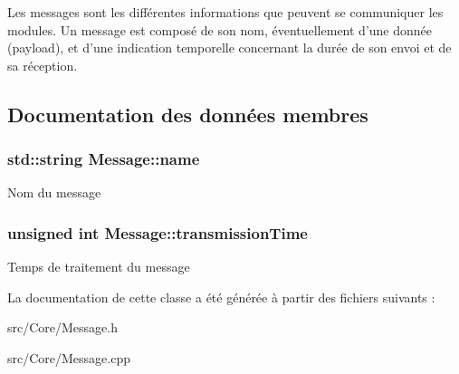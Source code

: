 Les messages sont les différentes informations que peuvent se communiquer les modules. Un message est composé de son nom, éventuellement d'une donnée (payload), et d'une indication temporelle concernant la durée de son envoi et de sa réception. 

\subsection{Documentation des données membres}
\hypertarget{classMessage_ac7adddb666acdc47c48f684bd6810a51}{
\subsubsection[{name}]{\setlength{\rightskip}{0pt plus 5cm}std\-::string Message\-::name\hspace{0.3cm}{\ttfamily [protected]}}}\label{classMessage_ac7adddb666acdc47c48f684bd6810a51}
Nom du message \hypertarget{classMessage_a9f2d70860e0ec546c8e00cd69a3555ee}{
\subsubsection[{transmission\-Time}]{\setlength{\rightskip}{0pt plus 5cm}unsigned int Message\-::transmission\-Time\hspace{0.3cm}{\ttfamily [protected]}}}\label{classMessage_a9f2d70860e0ec546c8e00cd69a3555ee}
Temps de traitement du message 

La documentation de cette classe a été générée à partir des fichiers suivants \-:\begin{DoxyCompactItemize}
\item 
src/\-Core/Message.\-h\item 
src/\-Core/Message.\-cpp\end{DoxyCompactItemize}
